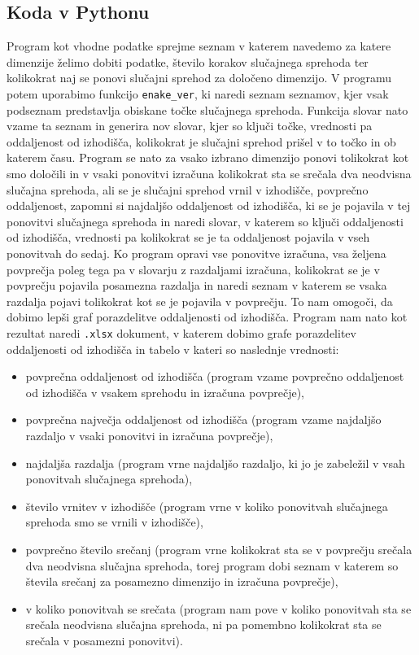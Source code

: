\documentclass[a4paper,oneside,12pt]{article}
\begin{document}
 \subsection{Koda v Pythonu}

 Program kot vhodne podatke sprejme seznam v katerem navedemo za katere dimenzije želimo dobiti podatke,
 število korakov slučajnega sprehoda ter kolikokrat naj se ponovi slučajni sprehod za določeno dimenzijo.
 V programu potem uporabimo funkcijo \texttt{enake\_ver}, ki naredi seznam seznamov, kjer vsak podseznam predstavlja obiskane točke slučajnega sprehoda.
 Funkcija slovar nato vzame ta seznam in generira nov slovar, kjer so ključi točke, vrednosti pa oddaljenost od izhodišča, kolikokrat je slučajni sprehod prišel v to točko in ob katerem času. Program se nato za vsako izbrano dimenzijo ponovi tolikokrat kot smo določili in v vsaki ponovitvi izračuna kolikokrat sta se srečala dva neodvisna slučajna sprehoda, ali se je slučajni sprehod vrnil v izhodišče, povprečno oddaljenost, zapomni si najdaljšo oddaljenost od izhodišča, ki se je pojavila v tej ponovitvi slučajnega sprehoda in naredi slovar, v katerem so ključi oddaljenosti od izhodišča, vrednosti pa kolikokrat se je ta oddaljenost pojavila v vseh ponovitvah do sedaj. Ko program opravi vse ponovitve izračuna, vsa željena 
 povprečja poleg tega pa v slovarju z razdaljami izračuna, kolikokrat se je v povprečju pojavila posamezna razdalja in naredi seznam v katerem se vsaka razdalja pojavi tolikokrat kot se je pojavila v povprečju.
 To nam omogoči, da dobimo lepši graf porazdelitve oddaljenosti od izhodišča. Program nam nato kot rezultat naredi \texttt{.xlsx} dokument, v katerem dobimo grafe porazdelitev oddaljenosti od izhodišča in tabelo v kateri so naslednje vrednosti:
\begin{itemize}
     \item povprečna oddaljenost od izhodišča (program vzame povprečno oddaljenost od izhodišča v vsakem sprehodu in izračuna povprečje),
     \item povprečna največja oddaljenost od izhodišča (program vzame najdaljšo razdaljo v vsaki ponovitvi in izračuna povprečje),
     \item najdaljša razdalja (program vrne najdaljšo razdaljo, ki jo je zabeležil v vsah ponovitvah slučajnega sprehoda),
     \item število vrnitev v izhodišče (program vrne v koliko ponovitvah slučajnega sprehoda smo se vrnili v izhodišče),
     \item povprečno število srečanj (program vrne kolikokrat sta se v povprečju srečala dva neodvisna slučajna sprehoda, torej program dobi seznam
     v katerem so števila srečanj za posamezno dimenzijo in izračuna povprečje),
     \item v koliko ponovitvah se srečata (program nam pove v koliko ponovitvah sta se srečala neodvisna slučajna sprehoda, ni pa pomembno kolikokrat sta se 
     srečala v posamezni ponovitvi).
\end{itemize}
\bigskip
\end{document}
